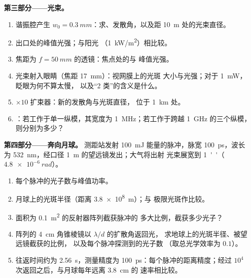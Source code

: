 \begin{problem}
\textbf{第三部分——光束。}
\begin{enumerate}[resume]
  \item 谐振腔产生 $w_0 = \qty{0.3}{mm}$：求、发散角，以及距 \qty{10}{m} 处的光束直径。
  \item 出口处的峰值光强；与阳光
        （\qty{1}{kW/m^2}）相比较。
  \item 焦距为 $f = \qty{50}{mm}$ 的透镜：焦点处的与
        峰值光强。
  \item 光束射入眼睛（焦距 \qty{17}{mm}）：视网膜上的光斑
        大小与光强；对于 \qty{1}{mW}，眨眼为何不算太慢，
        以及“2 类”的含义是什么。
  \item $\times 10$ 扩束器：新的发散角与光斑直径，
        位于 \qty{1}{km} 处。
  \item {}：若工作于单一纵模，其宽度为
        \qty{1}{MHz}；若工作于跨越 \qty{1}{GHz} 的三个纵模，则分别为多少？
\end{enumerate}

\textbf{第四部分——奔向月球。}
测距站发射 \qty{100}{mJ} 能量的脉冲，脉宽 \qty{100}{ps}，波长
为 \qty{532}{nm}，经口径 \qty{1}{m} 的望远镜发出；大气将出射
光束展宽到 \qty{1}{''}（$\qty{4.8e-6}{rad}$）。
\begin{enumerate}[resume]
  \item 每个脉冲的光子数与峰值功率。
  \item 月球上的光斑半径（距离 \qty{3.8e8}{m}）；与
        极限光斑作比较。
  \item 面积为 \qty{0.1}{m^2} 的反射器阵列截获脉冲的
        多大比例，截获多少光子？
  \item 阵列的 \qty{4}{cm} 角锥棱镜以 $\lambda/d$ 的扩散角返回光，
        求地球上的光斑半径、被望远镜截获的比例，
        以及每个脉冲探测到的光子数
        （取总光学效率为 $0.1$）。
  \item 往返时间约为 \qty{2.56}{s}，测量精度为
        \qty{100}{ps}：每个脉冲的距离精度；经过 $10^4$
        次返回之后，与月球每年远离 \qty{3.8}{cm} 的
        速率相比较。
\end{enumerate}
\end{problem}
